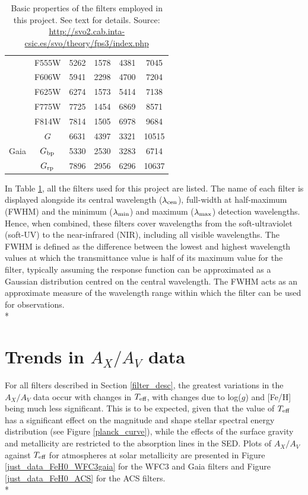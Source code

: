 \documentclass[12pt, a4paper]{report}
\begin{document}
\begin{table}
\begin{center}
\begin{tabular}{cccccc}
& F555W & 5262 & 1578 & 4381 & 7045 \\ %
& F606W & 5941 & 2298 & 4700 & 7204 \\ %
& F625W & 6274 & 1573 & 5414 & 7138 \\ %
& F775W & 7725 & 1454 & 6869 & 8571 \\ %
& F814W & 7814 & 1505 & 6978 & 9684 \\ %
\hline
& $G$ & 6631 & 4397 & 3321 & 10515 \\ %
Gaia & $G_{\textnormal{bp}}$ & 5330 & 2530 & 3283 & 6714 \\ %
& $G_{\textnormal{rp}}$ & 7896 & 2956 & 6296 & 10637 \\ %
\hline

\end{tabular}
\caption{Basic properties of the filters employed in this project. See text for details. Source: \protect\url{http://svo2.cab.inta-csic.es/svo/theory/fps3/index.php}}
\label{filter_basics}
\end{center}
\end{table}

In Table \ref{filter_basics}, all the filters used for this project are listed. The name of each filter is displayed alongside its central wavelength ($\lambda_{\textnormal{cen}}$), full-width at half-maximum (FWHM) and the minimum ($\lambda_{\textnormal{min}}$) and maximum ($\lambda_{\textnormal{max}}$) detection wavelengths. Hence, when combined, these filters cover wavelengths from the soft-ultraviolet (soft-UV) to the near-infrared (NIR), including all visible wavelengths. The FWHM is defined as the difference between the lowest and highest wavelength values at which the transmittance value is half of its maximum value for the filter, typically assuming the response function can be approximated as a Gaussian distribution centred on the central wavelength. The FWHM acts as an approximate measure of the wavelength range within which the filter can be used for observations.\\*

\section{Trends in $A_{X}/A_{V}$ data}
For all filters described in Section \ref{filter_desc}, the greatest variations in the $A_{X}/A_{V}$ data occur with changes in $T_{\textnormal{eff}}$, with changes due to log($g$) and [Fe/H] being much less significant. This is to be expected, given that the value of $T_{\textnormal{eff}}$ has a significant effect on the magnitude and shape stellar spectral energy distribution (see Figure \ref{planck_curve}), while the effects of the surface gravity and metallicity are restricted to the absorption lines in the SED. Plots of $A_{X}/A_{V}$ against $T_{\textnormal{eff}}$ for atmospheres at solar metallicity are presented in Figure \ref{just_data_FeH0_WFC3gaia} for the WFC3 and Gaia filters and Figure \ref{just_data_FeH0_ACS} for the ACS filters. \\*
\end{document}
